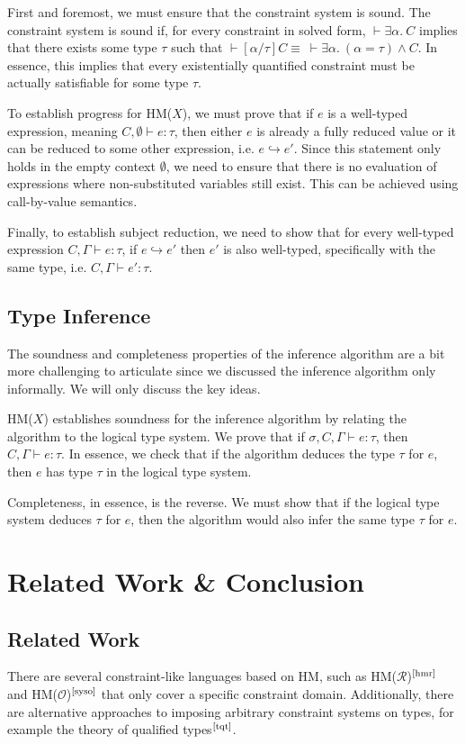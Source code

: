 \documentclass[runningheads]{llncs}
\newcommand{\hmx}{HM($X$)}
\newcommand{\hmr}{HM($\mathcal{R}$)}
\newcommand{\hmo}{HM($\mathcal{O}$)}
\begin{document}
First and foremost, we must ensure that the constraint system is sound. The
constraint system is sound if, for every constraint in solved form, $⊢ ∃α. \ C$
implies that there exists some type $τ$ such that
$⊢ [α/τ]C ≡ \ ⊢ ∃α. \ (α = τ) ∧ C$.
In essence, this implies that every existentially quantified constraint must be
actually satisfiable for some type $τ$.

To establish progress for \hmx{}, we must prove that if $e$ is a
well-typed expression, meaning $C, ∅ ⊢ e : τ$, then either $e$ is already a
fully reduced value or it can be reduced to some other expression,
i.e. $e ↪ e'$. Since this statement only holds in the empty context $∅$, we
need to ensure that there is no evaluation of expressions where non-substituted
variables still exist. This can be achieved using call-by-value semantics.

Finally, to establish subject reduction, we need to show that for every
well-typed expression $C, Γ ⊢ e : τ$, if $e ↪ e'$ then $e'$ is also well-typed,
specifically with the same type, i.e. $C, Γ ⊢ e' : τ$.

\subsection{Type Inference}
The soundness and completeness properties of the inference algorithm are a bit
more challenging to articulate since we discussed the inference algorithm only
informally. We will only discuss the key ideas.

\hmx{} establishes soundness for the inference algorithm by relating the
algorithm to the logical type system. We
prove that if $σ, C, Γ ⊢ e : τ$, then $C, Γ ⊢ e : τ$. In essence, we check
that if the algorithm deduces the type $τ$ for $e$, then $e$ has type $τ$ in
the logical type system.

Completeness, in essence, is the reverse. We must show that if the
logical type system deduces $τ$ for $e$, then the algorithm would also infer
the same type $τ$ for $e$.

\section{Related Work \& Conclusion}
\subsection{Related Work}
There are several constraint-like languages based on HM, such as
\hmr{}$^\text{\cite{hmr}}$ and \hmo{}$^\text{\cite{syso}}$ that only cover a
specific constraint domain.
Additionally, there are alternative approaches to imposing arbitrary constraint
systems on types, for example the theory of qualified
types$^\text{\cite{tqt}}$.
\end{document}
